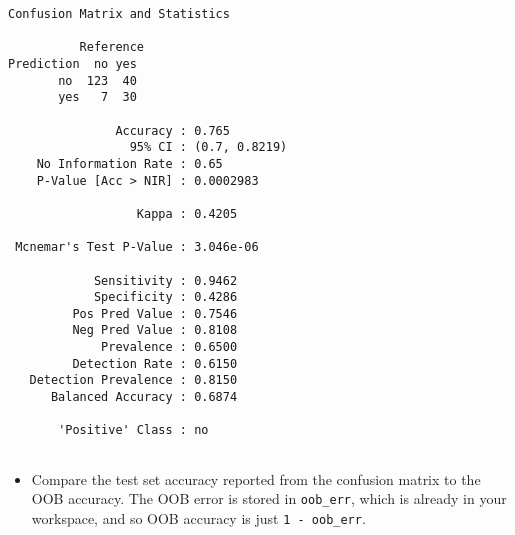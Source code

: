 \documentclass[
]{book}
\newenvironment{Shaded}{\begin{snugshade}}{\end{snugshade}}
\newcommand{\CommentTok}[1]{\textcolor[rgb]{0.56,0.35,0.01}{\textit{#1}}}
\newcommand{\DataTypeTok}[1]{\textcolor[rgb]{0.13,0.29,0.53}{#1}}
\newcommand{\DecValTok}[1]{\textcolor[rgb]{0.00,0.00,0.81}{#1}}
\newcommand{\KeywordTok}[1]{\textcolor[rgb]{0.13,0.29,0.53}{\textbf{#1}}}
\newcommand{\NormalTok}[1]{#1}
\newcommand{\OperatorTok}[1]{\textcolor[rgb]{0.81,0.36,0.00}{\textbf{#1}}}
\newcommand{\StringTok}[1]{\textcolor[rgb]{0.31,0.60,0.02}{#1}}
\providecommand{\tightlist}{%
  \setlength{\itemsep}{0pt}\setlength{\parskip}{0pt}}
\begin{document}
\begin{Shaded}
\end{Shaded}

\begin{verbatim}
Confusion Matrix and Statistics

          Reference
Prediction  no yes
       no  123  40
       yes   7  30
                                       
               Accuracy : 0.765        
                 95% CI : (0.7, 0.8219)
    No Information Rate : 0.65         
    P-Value [Acc > NIR] : 0.0002983    
                                       
                  Kappa : 0.4205       
                                       
 Mcnemar's Test P-Value : 3.046e-06    
                                       
            Sensitivity : 0.9462       
            Specificity : 0.4286       
         Pos Pred Value : 0.7546       
         Neg Pred Value : 0.8108       
             Prevalence : 0.6500       
         Detection Rate : 0.6150       
   Detection Prevalence : 0.8150       
      Balanced Accuracy : 0.6874       
                                       
       'Positive' Class : no           
                                       
\end{verbatim}

\begin{itemize}
\tightlist
\item
  Compare the test set accuracy reported from the confusion matrix to the OOB accuracy. The OOB error is stored in \texttt{oob\_err}, which is already in your workspace, and so OOB accuracy is just \texttt{1\ -\ oob\_err}.
\end{itemize}

\begin{Shaded}
\end{Shaded}
\end{document}
